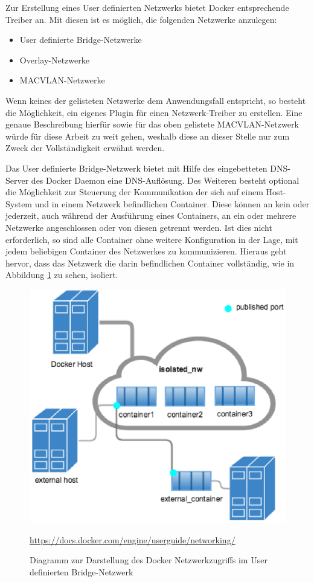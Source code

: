 Zur Erstellung eines User definierten Netzwerks bietet Docker entsprechende Treiber an.
Mit diesen ist es möglich, die folgenden Netzwerke anzulegen:

\begin{itemize}
	\item User definierte Bridge-Netzwerke
	\item Overlay-Netzwerke
	\item MACVLAN-Netzwerke
\end{itemize}

Wenn keines der gelisteten Netzwerke dem Anwendungsfall entspricht, so besteht die Möglichkeit, ein eigenes Plugin für einen Netzwerk-Treiber zu erstellen.
Eine genaue Beschreibung hierfür sowie für das oben gelistete MACVLAN-Netzwerk würde für diese Arbeit zu weit gehen, weshalb diese an dieser Stelle nur zum Zweck der Vollständigkeit erwähnt werden.

Das User definierte Bridge-Netzwerk bietet mit Hilfe des eingebetteten \ac{DNS}-Server des Docker Daemon eine \ac{DNS}-Auflösung.
Des Weiteren besteht optional die Möglichkeit zur Steuerung der Kommunikation der sich auf einem Host-System und in einem Netzwerk befindlichen Container.
Diese können an kein oder jederzeit, auch während der Ausführung eines Containers, an ein oder mehrere Netzwerke angeschlossen oder von diesen getrennt werden.
Ist dies nicht erforderlich, so sind alle Container ohne weitere Konfiguration in der Lage, mit jedem beliebigen Container des Netzwerkes zu kommunizieren.
Hieraus geht hervor, dass das Netzwerk die darin befindlichen Container vollständig, wie in Abbildung \ref{fig:dockerportpuex} zu sehen, isoliert.

\begin{figure}[H]
	\centering
	\includegraphics[width=0.7\linewidth]{figures/DockerPortPuEx}
	\caption[Docker Netzwerkzugriff]{Diagramm zur Darstellung des Docker Netzwerkzugriffs im User definierten Bridge-Netzwerk}
	\label{fig:dockerportpuex}
	\tiny{\quelle\url{https://docs.docker.com/engine/userguide/networking/}}
\end{figure}

